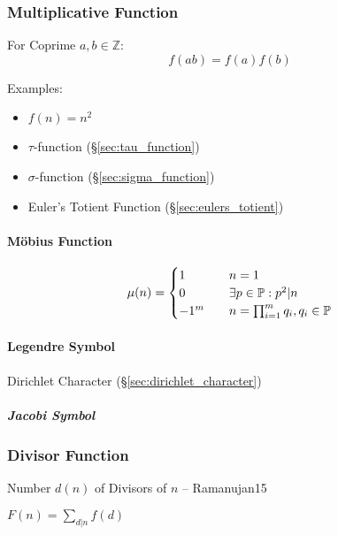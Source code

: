 \subsubsection{Multiplicative Function}
\label{sec:multiplicative_function}

For Coprime $a,b \in \mathbb{Z}$:
\[
  f(ab) = f(a)f(b)
\]

Examples:
\begin{itemize}
  \item $f(n) = n^2$
  \item $\tau$-function (\S\ref{sec:tau_function})
  \item $\sigma$-function (\S\ref{sec:sigma_function})
  \item Euler's Totient Function (\S\ref{sec:eulers_totient})
\end{itemize}



\paragraph{M\"obius Function}\label{sec:mobius_function}\hfill

\[
  \mu(n) =
  \begin{cases}
  1     & \quad n = 1 \\
  0     & \quad \exists p \in \mathbb{P} : p^2|n \\
  -1^m  & \quad n = \prod_{i = 1}^m q_i, q_i \in \mathbb{P} \\
  \end{cases}
\]



\paragraph{Legendre Symbol}\label{sec:legendre_symbol}\hfill

Dirichlet Character (\S\ref{sec:dirichlet_character})



\subparagraph{Jacobi Symbol}\label{sec:jacobi_symbol}\hfill



\subsubsection{Divisor Function}\label{sec:divisor_function}

Number $d(n)$ of Divisors of $n$ -- Ramanujan15

$F(n) = \sum_{d|n}f(d)$

